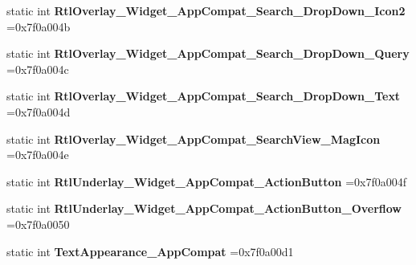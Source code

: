 \begin{DoxyCompactItemize}
\item 
\mbox{\label{classandroid_1_1support_1_1v7_1_1cardview_1_1R_1_1style_a5c6b25c2b0a7620ca26a7dcc336b10a5}} 
static int {\bfseries Rtl\+Overlay\+\_\+\+Widget\+\_\+\+App\+Compat\+\_\+\+Search\+\_\+\+Drop\+Down\+\_\+\+Icon2} =0x7f0a004b
\item 
\mbox{\label{classandroid_1_1support_1_1v7_1_1cardview_1_1R_1_1style_a57a79cedb548f56368e9dcd151ba58ae}} 
static int {\bfseries Rtl\+Overlay\+\_\+\+Widget\+\_\+\+App\+Compat\+\_\+\+Search\+\_\+\+Drop\+Down\+\_\+\+Query} =0x7f0a004c
\item 
\mbox{\label{classandroid_1_1support_1_1v7_1_1cardview_1_1R_1_1style_ae6605a4b6b9c93aed8034d38e28f4d1d}} 
static int {\bfseries Rtl\+Overlay\+\_\+\+Widget\+\_\+\+App\+Compat\+\_\+\+Search\+\_\+\+Drop\+Down\+\_\+\+Text} =0x7f0a004d
\item 
\mbox{\label{classandroid_1_1support_1_1v7_1_1cardview_1_1R_1_1style_a5a49d0b4ef5f1e31ddf12ce01eb82fe4}} 
static int {\bfseries Rtl\+Overlay\+\_\+\+Widget\+\_\+\+App\+Compat\+\_\+\+Search\+View\+\_\+\+Mag\+Icon} =0x7f0a004e
\item 
\mbox{\label{classandroid_1_1support_1_1v7_1_1cardview_1_1R_1_1style_a685be1e1fe8cffb40906cb02df59f332}} 
static int {\bfseries Rtl\+Underlay\+\_\+\+Widget\+\_\+\+App\+Compat\+\_\+\+Action\+Button} =0x7f0a004f
\item 
\mbox{\label{classandroid_1_1support_1_1v7_1_1cardview_1_1R_1_1style_a23a766eb687e327525ff29a4ca259f4c}} 
static int {\bfseries Rtl\+Underlay\+\_\+\+Widget\+\_\+\+App\+Compat\+\_\+\+Action\+Button\+\_\+\+Overflow} =0x7f0a0050
\item 
\mbox{\label{classandroid_1_1support_1_1v7_1_1cardview_1_1R_1_1style_a4d6a7485465e7ac2e36eeab389e035ae}} 
static int {\bfseries Text\+Appearance\+\_\+\+App\+Compat} =0x7f0a00d1
\item 

\end{DoxyCompactItemize}
